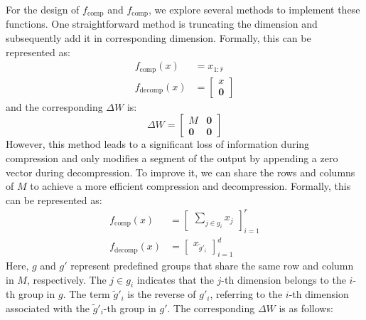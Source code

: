\documentclass[11pt]{article}
\begin{document}
For the design of $f_{\text{comp}}$ and $f_{\text{comp}}$, we explore several methods to implement these functions.
One straightforward method is truncating the dimension and subsequently add it in corresponding dimension.
Formally, this can be represented as:
\begin{equation}
\label{eq:cut}
\begin{split}
f_{\text{comp}}\left(x\right) &= x_{1:\hat{r}}\\
f_{\text{decomp}}\left(x\right) &= \begin{bmatrix} x \\ \mathbf{0} \end{bmatrix}
\end{split}
\end{equation}
and the corresponding $\Delta W$ is:
\begin{equation}
\Delta W = \begin{bmatrix}
M & \mathbf{0} \\
\mathbf{0} & \mathbf{0}
\end{bmatrix}
\end{equation}
However, this method leads to a significant loss of information during compression and only modifies a segment of the output by appending a zero vector during decompression.
To improve it, we can share the rows and columns of $M$ to achieve a more efficient compression and decompression. Formally, this can be represented as:
\begin{equation}
  \label{eq:share}
\begin{split}
  f_\text{comp}\left(x\right) &= \begin{bmatrix} \sum_{j \in g_i} x_j \end{bmatrix}_{i=1}^r\\
  f_{\text{decomp}}\left(x\right) &= \begin{bmatrix} x_{\widetilde{g}'_i} \end{bmatrix}_{i=1}^d
\end{split}
\end{equation}
Here, $g$ and $g'$ represent predefined groups that share the same row and column in $M$, respectively. The $j\in g_i$ indicates that the $j$-th dimension belongs to the $i$-th group in $g$. The term $\widetilde{g}'_i$ is the reverse of $g'_i$, referring to the $i$-th dimension associated with the $\widetilde{g}'_i$-th group in $g'$. The corresponding $\Delta W$ is as follows:
\end{document}
